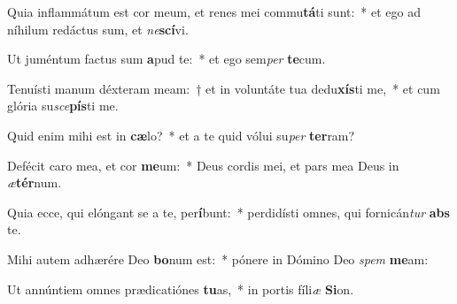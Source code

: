 \item Quia inflammátum est cor meum, et renes mei commu\textbf{tá}ti sunt:~* et ego ad níhilum redáctus sum, et \textit{ne}\textbf{scí}vi.
\item Ut juméntum factus sum \textbf{a}pud te:~* et ego sem\textit{per} \textbf{te}cum.
\item Tenuísti manum déxteram meam:~† et in voluntáte tua dedu\textbf{xís}ti me,~* et cum glória su\textit{sce}\textbf{pís}ti me.
\item Quid enim mihi est in \textbf{cæ}lo?~* et a te quid vólui su\textit{per} \textbf{ter}ram?
\item Defécit caro mea, et cor \textbf{me}um:~* Deus cordis mei, et pars mea Deus in \textit{æ}\textbf{tér}num.
\item Quia ecce, qui elóngant se a te, per\textbf{í}bunt:~* perdidísti omnes, qui fornicán\textit{tur} \textbf{abs} te.
\item Mihi autem adhærére Deo \textbf{bo}num est:~* pónere in Dómino Deo \textit{spem} \textbf{me}am:
\item Ut annúntiem omnes prædicatiónes \textbf{tu}as,~* in portis fíli\textit{æ} \textbf{Si}on.
